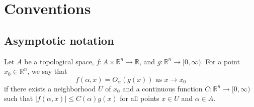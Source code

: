\section{Conventions}

\subsection{Asymptotic notation}


Let $A$ be a topological space, $f \colon A \times \mathbb{R}^n \to \mathbb{R}$, and $g \colon \mathbb{R}^n \to [0, \infty)$. For a point $x_0 \in \mathbb{R}^{n}$, we say that 
\begin{equation}
  f(\alpha, x) = O_\alpha(g(x)) \text{  as  } x \to x_0
\end{equation}
if there exists a neighborhood $U$ of $x_0$ and a continuous function  $C \colon \mathbb{R}^n \to [0, \infty)$ such that $|f(\alpha, x)| \leq C(\alpha) g(x)$ for all points $x \in U$ and $\alpha \in A$.
